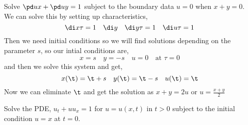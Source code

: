 \begin{eg}
  Solve $\pd u x + \pd u y = 1$ subject to the boundary data $u = 0$ when $x + y = 0$. We can solve this by setting up characteristics,
  $$ \di x \tau = 1 \quad \di y \quad \di y \tau = 1 \quad \di u \tau = 1 $$
  Then we need initial conditions so we will find solutions depending on the parameter $s$, so our intial conditions are,
  $$ x = s \quad y = -s \quad u = 0 \quad \text{at $\tau = 0$} $$
  and then we solve this system and get,
  $$ x(\t) = \t + s \quad y(\t) = \t - s \quad u(\t) = \t $$
  Now we can eliminate $\t$ and get the solution as $x + y = 2u$ or $u = \frac{x + y}{2}$
\end{eg}
\begin{eg}
  Solve the PDE, $u_t + uu_x = 1$ for $u = u(x, t)$ in $t > 0$ subject to the initial condition $u = x$ at $t = 0$.
\end{eg}